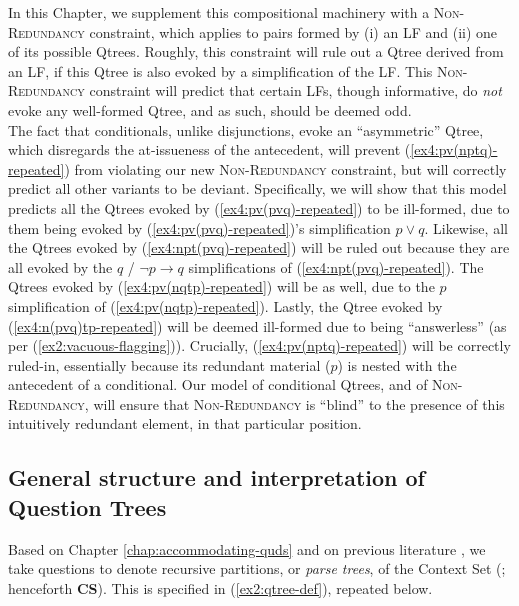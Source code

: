 In this Chapter, we supplement this compositional machinery with a \textsc{Non-Redundancy} constraint, which applies to pairs formed by (i) an LF and (ii) one of its possible Qtrees. Roughly, this constraint will rule out a Qtree derived from an LF, if this Qtree is also evoked by a simplification of the LF. This \textsc{Non-Redundancy} constraint will predict that certain LFs, though informative, do \textit{not} evoke any well-formed Qtree, and as such, should be deemed odd.\\


The fact that conditionals, unlike disjunctions, evoke an ``asymmetric'' Qtree, which disregards the at-issueness of the antecedent, will prevent (\ref{ex4:pv(nptq)-repeated}) from violating our new \textsc{Non-Redundancy} constraint, but will correctly predict all other variants to be deviant. Specifically, we will show that this model predicts all the Qtrees evoked by (\ref{ex4:pv(pvq)-repeated}) to be ill-formed, due to them being evoked by (\ref{ex4:pv(pvq)-repeated})'s simplification $p \vee q$. Likewise, all the Qtrees evoked by
(\ref{ex4:npt(pvq)-repeated}) will be ruled out because they are all evoked by the $q$ / $\neg p \rightarrow q$ simplifications of (\ref{ex4:npt(pvq)-repeated}). The Qtrees evoked by (\ref{ex4:pv(nqtp)-repeated}) will be as well, due to the $p$ simplification of (\ref{ex4:pv(nqtp)-repeated}). Lastly, the Qtree evoked by (\ref{ex4:n(pvq)tp-repeated}) will be deemed ill-formed due to being ``answerless'' (as per (\ref{ex2:vacuous-flagging})). Crucially, (\ref{ex4:pv(nptq)-repeated}) will be correctly ruled-in, essentially because its redundant material ($p$) is nested with the antecedent of a conditional. Our model of conditional Qtrees, and of \textsc{Non-Redundancy}, will ensure that \textsc{Non-Redundancy} is ``blind'' to the presence of this intuitively redundant element, in that particular position.


\subsection{General structure and interpretation of Question Trees}

Based on Chapter \ref{chap:accommodating-quds} and on previous literature \citep{Buring2003,Riester2019,Ippolito2019,Onea2016,Zhang2022}, we take questions to denote recursive partitions, or \textit{parse trees}, of the Context Set (; henceforth \textbf{CS}). This is specified in (\ref{ex2:qtree-def}), repeated below.

